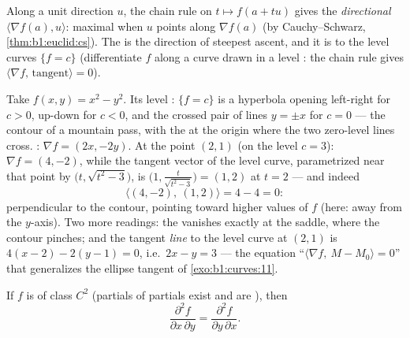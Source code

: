 \begin{remark}
Along a unit direction $u$, the chain rule on $t \mapsto f(a + tu)$
gives the \emph{directional } $\langle \nabla f(a),
u\rangle$: maximal when $u$ points along $\nabla f(a)$ (by
Cauchy--Schwarz, \cref{thm:b1:euclid:cs}). The  is the
direction of steepest ascent, and it is  to the level
curves $\{f = c\}$ (differentiate $f$ along a curve drawn in a
level : the chain rule gives $\langle\nabla f,\,
\text{tangent}\rangle = 0$).
\end{remark}

\begin{example}
\label{ex:b1:multivar:levelcurves}
Take $f(x, y) = x^2 - y^2$. Its level : $\{f = c\}$ is a
hyperbola opening left-right for $c > 0$, up-down for $c < 0$,
and the crossed pair of lines $y = \pm x$ for $c = 0$ --- the
contour  of a mountain pass, with the  at the
origin where the two zero-level lines cross. : $\nabla
f = (2x, -2y)$. At the point $(2, 1)$ (on the level $c = 3$):
$\nabla f = (4, -2)$, while the tangent vector of the level
curve, parametrized near that point by $\bigl(t,
\sqrt{t^2 - 3}\bigr)$, is $\bigl(1, \frac{t}{\sqrt{t^2 -
3}}\bigr) = (1, 2)$ at $t = 2$ --- and indeed
\[
\langle (4, -2),\ (1, 2)\rangle = 4 - 4 = 0 :
\]
 perpendicular to the contour, pointing toward higher
values of $f$ (here: away from the $y$-axis). Two more
readings: the  vanishes exactly at the saddle, where
the contour  pinches; and the tangent \emph{line} to the
level curve at $(2,1)$ is $4(x - 2) - 2(y - 1) = 0$, i.e.\ $2x -
y = 3$ --- the equation ``$\langle \nabla f,\ M - M_0\rangle =
0$'' that generalizes the ellipse tangent of
\cref{exo:b1:curves:11}.
\end{example}

\begin{theorem}[Schwarz]\label{thm:b1:multivar:schwarz}
If $f$ is of class $C^2$ (partials of partials exist and are
), then
\[
\frac{\partial^2 f}{\partial x\,\partial y}
= \frac{\partial^2 f}{\partial y\,\partial x} .
\]
\end{theorem}
\admitted

